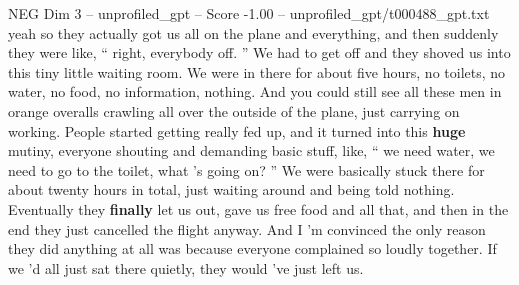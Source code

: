 \begin{textsample}{NEG Dim 3 – unprofiled\_gpt – Score -1.00 – unprofiled\_gpt/t000488\_gpt.txt}  \label{ex:f3_neg_016}
yeah so they actually got us all on the plane and everything, and then suddenly they were like, “ right, everybody off. ” We had to get off and they shoved us into this tiny little waiting room.
We were in there for about five hours, no toilets, no water, no food, no information, nothing.
And you could still see all these men in orange overalls crawling all over the outside of the plane, just carrying on working.
People started getting really fed up, and it turned into this \textbf{huge} mutiny, everyone shouting and demanding basic stuff, like, “ we need water, we need to go to the toilet, what ’s going on? ” We were basically stuck there for about twenty hours in total, just waiting around and being told nothing.
Eventually they \textbf{finally} let us out, gave us free food and all that, and then in the end they just cancelled the flight anyway.
And I ’m convinced the only reason they did anything at all was because everyone complained so loudly together.
If we ’d all just sat there quietly, they would ’ve just left us.

\end{textsample}

